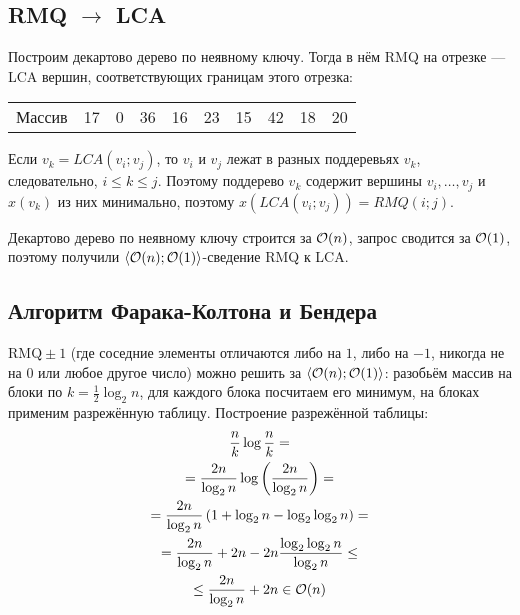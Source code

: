 \subsection{RMQ $\to$ LCA}
Построим декартово дерево по неявному ключу.
Тогда в нём RMQ на отрезке --- LCA вершин,
соответствующих границам этого отрезка:

\begin{center}
    \begin{tabular}{r|ccccccccc|}
        Массив & 17 & 0 & 36 & 16 & 23 & 15 & 42 & 18 & 20 \\
    \end{tabular}

\end{center}

Если $v_k = LCA(v_i; v_j)$, то
$v_i$ и $v_j$ лежат в разных поддеревьях $v_k$,
следовательно, $i \le k \le j$.
Поэтому поддерево $v_k$ содержит вершины $v_i, \ldots, v_j$
и $x(v_k)$ из них минимально, поэтому
$x(LCA(v_i; v_j)) = RMQ(i; j)$.

Декартово дерево по неявному ключу строится за $\mathcal{O}(n)$,
запрос сводится за $\mathcal{O}(1)$,
поэтому получили $\langle \mathcal{O}(n); \mathcal{O}(1) \rangle$-сведение
RMQ к LCA.

\subsection{Алгоритм Фарака-Колтона и Бендера}
$\text{RMQ}\pm 1$ (где соседние элементы отличаются
либо на $1$, либо на $-1$, никогда не на $0$ или любое другое число)
можно решить за $\langle \mathcal{O}(n); \mathcal{O}(1) \rangle$:
разобьём массив на блоки по $k = \frac{1}{2} \log_2 n$,
для каждого блока посчитаем его минимум, на блоках
применим разрежённую таблицу.
Построение разрежённой таблицы:
\begin{gather*}
    \frac{n}{k} \log \frac{n}{k} = \\
    = \frac{2n}{\log_2 n} \log \left( \frac{2n}{\log_2 n} \right) = \\
    = \frac{2n}{\log_2 n} \left( 1 + \log_2 n - \log_2 \log_2 n \right) = \\
    = \frac{2n}{\log_2 n} + 2n - 2n \frac{\log_2 \log_2 n}{\log_2 n} \le \\
    \le \frac{2n}{\log_2 n} + 2n \in \mathcal{O}(n)
\end{gather*}

